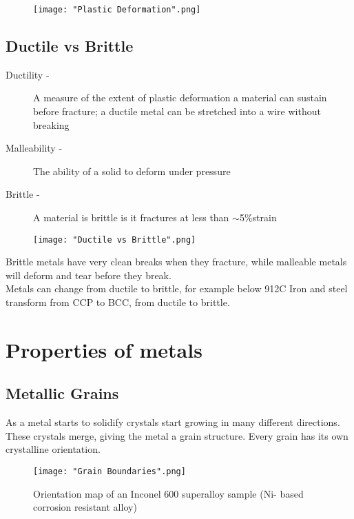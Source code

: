 \documentclass[a4paper, 12pt]{article}
\begin{document}
			\begin{figure}[!h]
				\texttt{[image: "Plastic Deformation".png]}
			\end{figure}
			
		\subsection{Ductile vs Brittle}
			\begin{description}
				\item[Ductility - ] A measure of the extent of plastic deformation a material can sustain before fracture; a ductile metal can be stretched into a wire without breaking
				\item[Malleability - ] The ability of a solid to deform under pressure
				\item[Brittle - ] A material is brittle is it fractures at less than $\sim$5\%strain
			\end{description}
			

			\begin{figure}
				\texttt{[image: "Ductile vs Brittle".png]}
			\end{figure}

			Brittle metals have very clean breaks when they fracture, while malleable metals will deform and tear before they break. \\
			Metals can change from ductile to brittle, for example below 912\degree C Iron and steel transform from CCP to BCC, from ductile to brittle. \\
		
	\pagebreak
	
	\section{Properties of metals}
		\subsection{Metallic Grains}
			As a metal starts to solidify crystals start growing in many different directions. These crystals merge, giving the metal a grain structure. Every grain has its own crystalline orientation. 
			
			\begin{wrapfigure}{l}{0.5\textwidth}
				\caption{Orientation map of an Inconel 600 superalloy sample (Ni- based corrosion resistant alloy)}
				\texttt{[image: "Grain Boundaries".png]}
			\end{wrapfigure}
		
\end{document}
